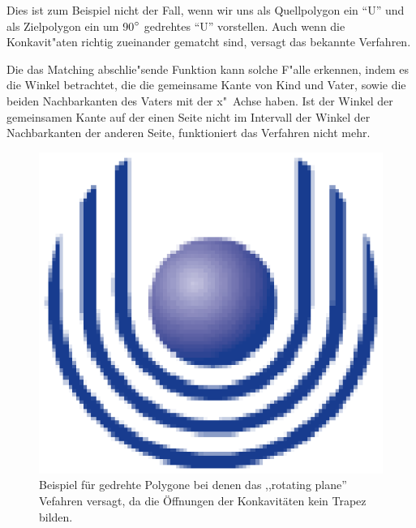 Dies ist zum Beispiel nicht der Fall, wenn wir uns als Quellpolygon ein "`U"' und als Zielpolygon ein um 90$\degree$ gedrehtes "`U"' vorstellen. Auch wenn die Konkavit"aten richtig zueinander gematcht sind, versagt das bekannte Verfahren.

Die das Matching abschlie"sende Funktion kann solche F"alle erkennen, indem es die Winkel betrachtet, die die gemeinsame Kante von Kind und Vater, sowie die beiden Nachbarkanten des Vaters mit der x"~Achse haben. Ist der Winkel der gemeinsamen Kante auf der einen Seite nicht im  Intervall der Winkel der Nachbarkanten der anderen Seite, funktioniert das Verfahren nicht mehr.

\begin{figure}
	\centering
	\includegraphics{feu_logo2.eps}
	\caption[Beispiel für gedrehte Polygone]{Beispiel für gedrehte Polygone bei denen das ,,rotating plane'' Vefahren versagt, da die Öffnungen der Konkavitäten kein Trapez bilden.}
	\label{fig:gedrehteMatches}
\end{figure}


